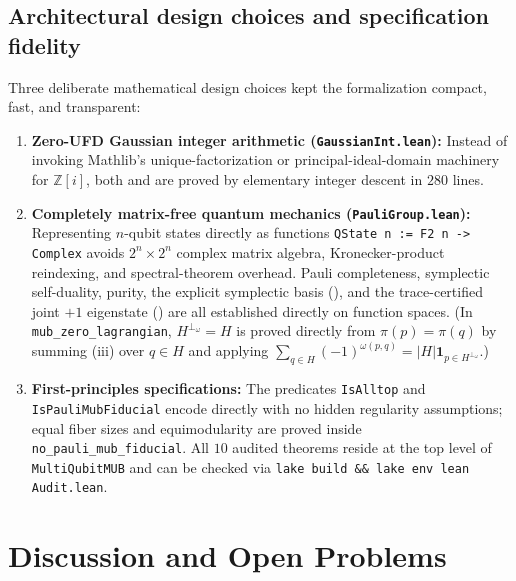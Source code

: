 \documentclass[11pt,a4paper]{article}
\theoremstyle{plain}
\theoremstyle{definition}
\theoremstyle{remark}
\newcommand{\Zi}{\mathbb{Z}[i]}
\newcommand{\abs}[1]{\lvert#1\rvert}
\newcommand{\indic}[1]{\mathbf{1}_{#1}}
\newcommand{\lean}[1]{\texttt{\small #1}}
\numberwithin{equation}{section}
\begin{document}
\subsection{Architectural design choices and specification fidelity}

Three deliberate mathematical design choices kept the formalization compact, fast, and transparent:
\begin{enumerate}[leftmargin=1.8em]
  \item \textbf{Zero-UFD Gaussian integer arithmetic (\lean{GaussianInt.lean}):} Instead of invoking Mathlib's unique-factorization or principal-ideal-domain machinery for $\Zi$, both  and  are proved by elementary integer descent in $280$ lines.
  \item \textbf{Completely matrix-free quantum mechanics (\lean{PauliGroup.lean}):} Representing $n$-qubit states directly as functions \lean{QState n := F2 n -> Complex} avoids $2^n \times 2^n$ complex matrix algebra, Kronecker-product reindexing, and spectral-theorem overhead. Pauli completeness, symplectic self-duality, purity, the explicit symplectic basis (), and the trace-certified joint $+1$ eigenstate () are all established directly on function spaces. (In \lean{mub\_\allowbreak zero\_\allowbreak lagrangian}, $H^{\perp_\omega} = H$ is proved directly from $\pi(p)=\pi(q)$ by summing (iii) over $q \in H$ and applying $\sum_{q \in H} (-1)^{\omega(p, q)} = \abs{H}\indic{p \in H^{\perp_\omega}}$.)
  \item \textbf{First-principles specifications:} The predicates \lean{IsAlltop} and \lean{IsPauli\allowbreak MubFiducial} encode  directly with no hidden regularity assumptions; equal fiber sizes and equimodularity are proved inside \lean{no\_pauli\_\allowbreak mub\_fiducial}. All $10$ audited theorems reside at the top level of \lean{MultiQubitMUB} and can be checked via \lean{lake build \&\& lake env lean Audit.lean}.
\end{enumerate}

\section{Discussion and Open Problems}\label{sec:open}
\end{document}
